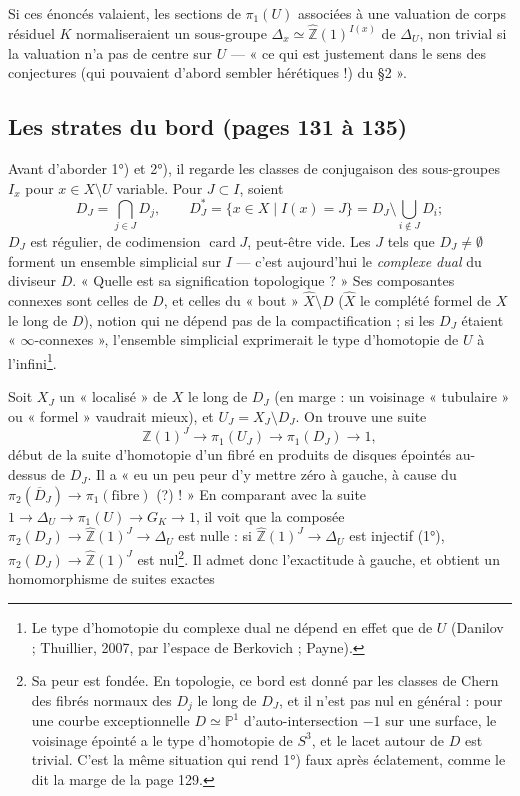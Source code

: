 \documentclass[11pt,a4paper]{article}
\begin{document}
Si ces énoncés valaient, les sections de $\pi_1(U)$ associées à une valuation
de corps résiduel $K$ normaliseraient un sous-groupe $\Delta_x \simeq
\widehat{\mathbb{Z}}(1)^{I(x)}$ de $\Delta_U$, non trivial si la valuation n'a
pas de centre sur $U$ — « ce qui est justement dans le sens des conjectures
(qui pouvaient d'abord sembler hérétiques !) du §2 ».

\subsection*{Les strates du bord (pages 131 à 135)}

Avant d'aborder 1°) et 2°), il regarde les classes de conjugaison des
sous-groupes $I_x$ pour $x \in X \setminus U$ variable. Pour $J \subset I$,
soient
\[
D_J = \bigcap_{j \in J} D_j, \qquad D_J^{*} = \{x \in X \mid I(x) = J\} =
D_J \setminus \bigcup_{i \notin J} D_i ;
\]
$D_J$ est régulier, de codimension $\operatorname{card} J$, peut-être vide.
Les $J$ tels que $D_J \ne \emptyset$ forment un ensemble simplicial sur $I$ —
c'est aujourd'hui le \emph{complexe dual} du diviseur $D$. « Quelle est sa
signification topologique ? » Ses composantes connexes sont celles de $D$, et
celles du « bout » $\widehat{X} \setminus D$ ($\widehat{X}$ le complété formel
de $X$ le long de $D$), notion qui ne dépend pas de la compactification ; si les
$D_J$ étaient « $\infty$-connexes », l'ensemble simplicial exprimerait le type
d'homotopie de $U$ à l'infini\footnote{Le type d'homotopie du complexe dual
ne dépend en effet que de $U$ (Danilov ; Thuillier, 2007, par l'espace de
Berkovich ; Payne).}.

Soit $X_J$ un « localisé » de $X$ le long de $D_J$ (en marge : un voisinage
« tubulaire » ou « formel » vaudrait mieux), et $U_J = X_J \setminus D_J$. On
trouve une suite
\[
\widehat{\mathbb{Z}}(1)^J \longrightarrow \pi_1(U_J) \longrightarrow
\pi_1(D_J) \longrightarrow 1,
\]
début de la suite d'homotopie d'un fibré en produits de disques épointés
au-dessus de $D_J$. Il a « eu un peu peur d'y mettre zéro à gauche, à cause du
$\pi_2(\overline{D}_J) \to \pi_1(\text{fibre})$ (?) ! » En comparant avec la
suite $1 \to \Delta_U \to \pi_1(U) \to G_K \to 1$, il voit que la composée
$\pi_2(D_J) \to \widehat{\mathbb{Z}}(1)^J \to \Delta_U$ est nulle : si
$\widehat{\mathbb{Z}}(1)^J \to \Delta_U$ est injectif (1°), $\pi_2(D_J) \to
\widehat{\mathbb{Z}}(1)^J$ est nul\footnote{Sa peur est fondée. En topologie,
ce bord est donné par les classes de Chern des fibrés normaux des $D_j$ le long
de $D_J$, et il n'est pas nul en général : pour une courbe exceptionnelle
$D \simeq \mathbb{P}^1$ d'auto-intersection $-1$ sur une surface, le voisinage
épointé a le type d'homotopie de $S^3$, et le lacet autour de $D$ est trivial.
C'est la même situation qui rend 1°) faux après éclatement, comme le dit la
marge de la page 129.}. Il admet donc l'exactitude à gauche, et obtient un
homomorphisme de suites exactes
\end{document}
